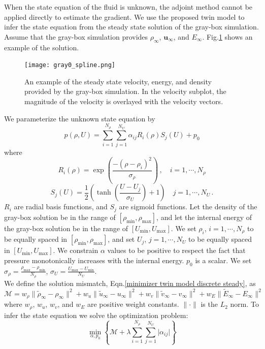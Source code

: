 \documentclass{paper1}
\begin{document}
When the state equation of the fluid is unknown, the 
adjoint method cannot be applied directly
to estimate the gradient. We use the proposed twin model to infer the state
equation from the steady state solution of the gray-box simulation.
Assume that the gray-box simulation provides $\rho_\infty$, $\boldsymbol{u}_\infty$,
and $E_\infty$. 
Fig.\ref{gray sol} shows an example of the solution.
\begin{figure}\begin{center}
    \texttt{[image: gray0\_spline.png]}
    \caption{An example of the steady state velocity, energy, and density provided 
    by the gray-box simulation. In the velocity subplot, the 
    magnitude of the velocity is overlayed with the velocity vectors.}
    \label{gray sol}
\end{center}\end{figure}


We parameterize the unknown state equation by
\begin{equation}
    p(\rho, U) = \sum_{i=1}^{N_\rho} \sum_{j=1}^{N_U} \alpha_{ij} R_i(\rho) S_j(U) 
    + p_0
    \label{parameterization}
\end{equation}
where
\begin{equation}
    R_i(\rho) = \exp\left(\frac{-(\rho-\rho_i)^2}{\sigma_\rho}\right)\,,\quad i=1,\cdots,N_\rho 
\end{equation}
\begin{equation}
    S_j(U) = \frac{1}{2}\left(\tanh\left( \frac{U-U_j}{\sigma_U}\right) +1\right)
    \quad j = 1,\cdots,N_U\,.
\end{equation}
$R_i$ are radial basis functions, and $S_j$ are sigmoid functions.
Let the density of the gray-box solution be in the range of $[\rho_{\min}, \rho_{\max}]$, and
let the internal energy of the gray-box solution be in the range of $[U_{\min}, U_{\max}]$.
We set $\rho_i$, $i=1,\cdots,N_\rho$ to be equally spaced in $[\rho_{\min}, \rho_{\max}]$, and set
$U_j$, $j=1,\cdots,N_U$ to be equally spaced in $[U_{\min}, U_{\max}]$.
We constrain $\alpha$ values to be positive to respect the fact that pressure
monotonically increases with the internal energy.
$p_0$ is a scalar. We set $\sigma_\rho=\frac{\rho_{\max}-\rho_{\min}}{N_\rho}$, 
$\sigma_U = \frac{U_{\max}-U_{\min}}{N_U}$.\\

We define the solution mismatch, Eqn.\eqref{minimizer twin model discrete steady}, as
\begin{equation}
    \mathcal{M} = w_\rho \|\tilde{\rho}_{\infty} - \rho_{\infty}\|^2
                + w_u
                \|\tilde{u}_{\infty}- u_{\infty}\|^2
                + w_v
                \|\tilde{v}_{\infty}- v_{\infty}\|^2
                + w_E
                \|\tilde{E}_{\infty} - E_\infty\|^2
    \label{NS mismatch}
\end{equation}
where $w_\rho$, $w_u$, $w_v$, and $w_E$ are positive weight constants.
$\|\cdot\|$ is the $L_2$ norm.
To infer the state equation we solve the optimization problem:
\begin{equation}
    \min_{\alpha, p_0} \left\{\mathcal{M} +\lambda 
    \sum_{i=1}^{N_\rho}\sum_{j=1}^{N_U} \big|\alpha_{ij}\big|
    \right\}
    \label{NS optimize}
\end{equation}
\end{document}

